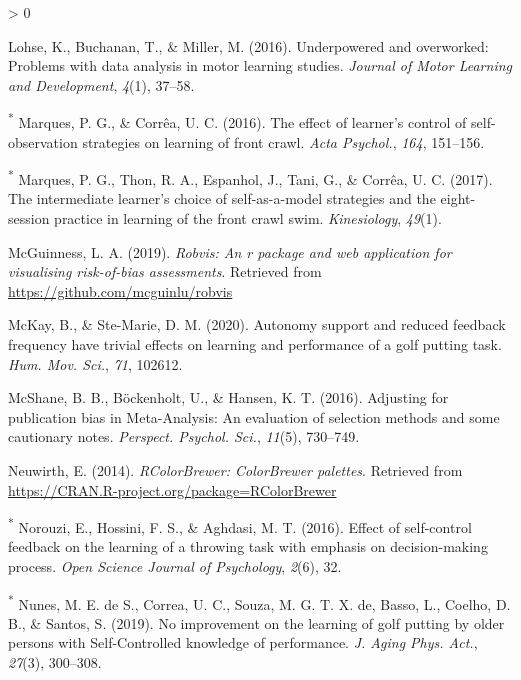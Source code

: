 \documentclass[
  english,
  man,floatsintext]{apa7}
\newlength{\cslhangindent}
\newenvironment{CSLReferences}[2] %
 {%
  \setlength{\parindent}{0pt}
  \ifodd #1 \everypar{\setlength{\hangindent}{\cslhangindent}}\ignorespaces\fi
  \ifnum #2 > 0
  \setlength{\parskip}{#2\baselineskip}
  \fi
 }%
 {}
\begin{document}
\begin{CSLReferences}{1}{0}
\leavevmode\hypertarget{ref-Lohse2016-cf}{}%
Lohse, K., Buchanan, T., \& Miller, M. (2016). Underpowered and overworked: Problems with data analysis in motor learning studies. \emph{Journal of Motor Learning and Development}, \emph{4}(1), 37--58.

\leavevmode\hypertarget{ref-Marques2016-aw}{}%
\textsuperscript{*} Marques, P. G., \& Corrêa, U. C. (2016). The effect of learner's control of self-observation strategies on learning of front crawl. \emph{Acta Psychol.}, \emph{164}, 151--156.

\leavevmode\hypertarget{ref-Marques2017-ue}{}%
\textsuperscript{*} Marques, P. G., Thon, R. A., Espanhol, J., Tani, G., \& Corrêa, U. C. (2017). The intermediate learner's choice of self-as-a-model strategies and the eight-session practice in learning of the front crawl swim. \emph{Kinesiology}, \emph{49}(1).

\leavevmode\hypertarget{ref-R-robvis}{}%
McGuinness, L. A. (2019). \emph{Robvis: An r package and web application for visualising risk-of-bias assessments}. Retrieved from \url{https://github.com/mcguinlu/robvis}

\leavevmode\hypertarget{ref-McKay2020-vj}{}%
McKay, B., \& Ste-Marie, D. M. (2020). Autonomy support and reduced feedback frequency have trivial effects on learning and performance of a golf putting task. \emph{Hum. Mov. Sci.}, \emph{71}, 102612.

\leavevmode\hypertarget{ref-McShane2016-by}{}%
McShane, B. B., Böckenholt, U., \& Hansen, K. T. (2016). Adjusting for publication bias in {Meta-Analysis}: An evaluation of selection methods and some cautionary notes. \emph{Perspect. Psychol. Sci.}, \emph{11}(5), 730--749.

\leavevmode\hypertarget{ref-R-rcolorbrewer}{}%
Neuwirth, E. (2014). \emph{RColorBrewer: ColorBrewer palettes}. Retrieved from \url{https://CRAN.R-project.org/package=RColorBrewer}

\leavevmode\hypertarget{ref-Norouzi2016-cx}{}%
\textsuperscript{*} Norouzi, E., Hossini, F. S., \& Aghdasi, M. T. (2016). Effect of self-control feedback on the learning of a throwing task with emphasis on decision-making process. \emph{Open Science Journal of Psychology}, \emph{2}(6), 32.

\leavevmode\hypertarget{ref-Nunes2019-nr}{}%
\textsuperscript{*} Nunes, M. E. de S., Correa, U. C., Souza, M. G. T. X. de, Basso, L., Coelho, D. B., \& Santos, S. (2019). No improvement on the learning of golf putting by older persons with {Self-Controlled} knowledge of performance. \emph{J. Aging Phys. Act.}, \emph{27}(3), 300--308.


\end{CSLReferences}
\end{document}
